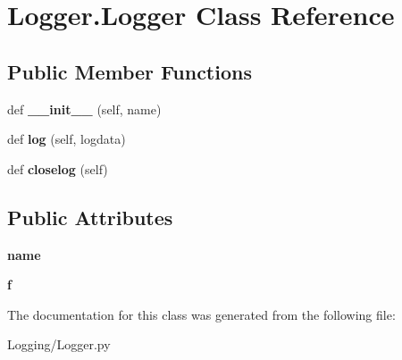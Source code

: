 \hypertarget{classLogger_1_1Logger}{}\section{Logger.\+Logger Class Reference}
\label{classLogger_1_1Logger}
\subsection*{Public Member Functions}
\begin{DoxyCompactItemize}
\item 
\mbox{\label{classLogger_1_1Logger_ace6f80cd04b9dd7e94e5d7fcfef32305}} 
def {\bfseries \+\_\+\+\_\+init\+\_\+\+\_\+} (self, name)
\item 
\mbox{\label{classLogger_1_1Logger_a42a2f4373ea4da023da7d2efea79e58e}} 
def {\bfseries log} (self, logdata)
\item 
\mbox{\label{classLogger_1_1Logger_ae547ee628b2c23311883b5b86a328fcd}} 
def {\bfseries closelog} (self)
\end{DoxyCompactItemize}
\subsection*{Public Attributes}
\begin{DoxyCompactItemize}
\item 
\mbox{\label{classLogger_1_1Logger_a8dccc57c697362592c45977d170c97bb}} 
{\bfseries name}
\item 
\mbox{\label{classLogger_1_1Logger_a07e92059e6338cbc920c7f2f34629c27}} 
{\bfseries f}
\end{DoxyCompactItemize}


The documentation for this class was generated from the following file\+:\begin{DoxyCompactItemize}
\item 
Logging/Logger.\+py\end{DoxyCompactItemize}
